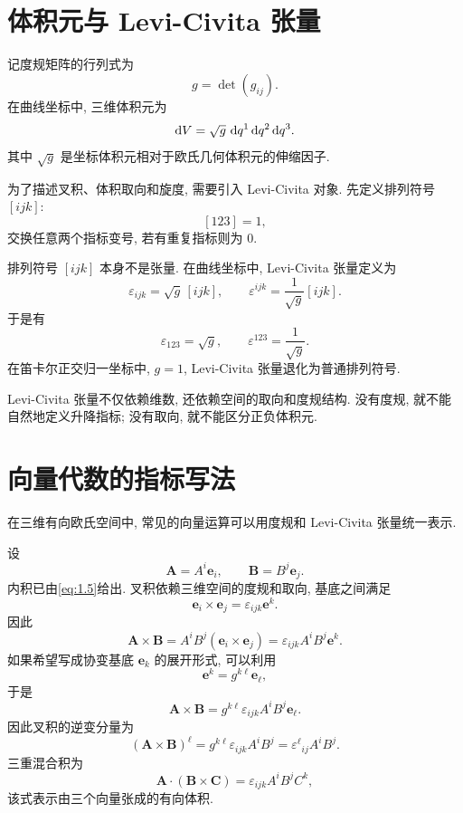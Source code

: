 \section{体积元与 Levi-Civita 张量}

记度规矩阵的行列式为
\[
g=\det{(g_{ij})}.
\]
在曲线坐标中, 三维体积元为
\begin{equation}
\mathop{}\!\mathrm{d} V
=
\sqrt{g}\,\mathop{}\!\mathrm{d} q^{1}\mathop{}\!\mathrm{d} q^{2}\mathop{}\!\mathrm{d} q^{3}. \label{eq:1.6}
\end{equation}
其中 $\sqrt{g}$ 是坐标体积元相对于欧氏几何体积元的伸缩因子. 

为了描述叉积、体积取向和旋度, 需要引入 Levi-Civita 对象. 先定义排列符号 $[ijk]$: 
\[
[123]=1,
\]
交换任意两个指标变号, 若有重复指标则为 $0$. 

排列符号 $[ijk]$ 本身不是张量. 在曲线坐标中, Levi-Civita 张量定义为
\begin{equation}
\varepsilon_{ijk}
=
\sqrt{g}\,[ijk],
\qquad
\varepsilon^{ijk}
=
\frac{1}{\sqrt{g}}[ijk]. \label{eq:1.7}
\end{equation}
于是有
\[
\varepsilon_{123}=\sqrt{g},
\qquad
\varepsilon^{123}=\frac{1}{\sqrt{g}}.
\]
在笛卡尔正交归一坐标中, $g=1$, Levi-Civita 张量退化为普通排列符号. 

Levi-Civita 张量不仅依赖维数, 还依赖空间的取向和度规结构. 没有度规, 就不能自然地定义升降指标; 没有取向, 就不能区分正负体积元. 

\section{向量代数的指标写法}

在三维有向欧氏空间中, 常见的向量运算可以用度规和 Levi-Civita 张量统一表示. 

设
\[
\bm{A}=A^{i}\bm{e}_{i},
\qquad
\bm{B}=B^{j}\bm{e}_{j}.
\]
内积已由\eqref{eq:1.5}给出. 叉积依赖三维空间的度规和取向, 基底之间满足
\[
\bm{e}_{i}\times \bm{e}_{j}
=
\varepsilon_{ijk}\bm{e}^{k}.
\]
因此
\begin{equation}
\bm{A}\times \bm{B}
=
A^{i}B^{j}(\bm{e}_{i}\times \bm{e}_{j})
=
\varepsilon_{ijk}A^{i}B^{j}\bm{e}^{k}. \label{eq:1.8}
\end{equation}
如果希望写成协变基底 $\bm{e}_{k}$ 的展开形式, 可以利用
\[
\bm{e}^{k}=g^{k\ell}\bm{e}_{\ell},
\]
于是
\[
\bm{A}\times \bm{B}
=
g^{k\ell}\varepsilon_{ijk}A^{i}B^{j}\bm{e}_{\ell}.
\]
因此叉积的逆变分量为
\begin{equation}
(\bm{A}\times \bm{B})^{\ell}
=
g^{k\ell}\varepsilon_{ijk}A^{i}B^{j}
=
\varepsilon^{\ell}{}_{ij}A^{i}B^{j}. \label{eq:1.9}
\end{equation}
三重混合积为
\[
\bm{A}\cdot(\bm{B}\times \bm{C})
=
\varepsilon_{ijk}A^{i}B^{j}C^{k},
\]
该式表示由三个向量张成的有向体积. 


